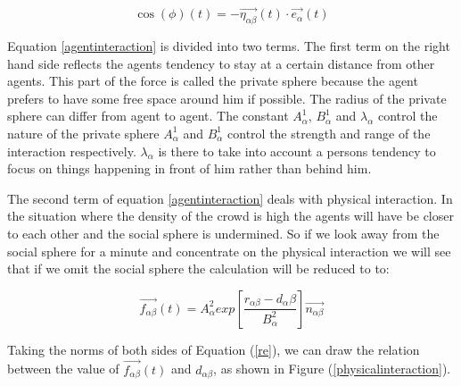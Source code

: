 \begin{equation}
\cos \left( \phi \right)
	\left( t \right) 
		= 
	- \vec{\eta_{\alpha \beta}}
		\left( t \right) 
	\cdot 
\vec{e_{\alpha}}\left( t \right)
\end{equation}

Equation \eqref{agentinteraction} is divided into two terms. The first term on 
the right hand side reflects the agents tendency to stay at a certain distance 
from other agents. This part of the force is called the private sphere because 
the agent prefers to have some free space around him if possible. The radius 
of the private sphere can differ from agent to agent. The constant 
$A_{\alpha}^{1}$, $B_{\alpha}^{1}$ and $\lambda_{\alpha}$ control the nature 
of the private sphere $A_{\alpha}^1$ and $B_{\alpha}^1$ control the strength 
and range of the interaction respectively. $\lambda_{\alpha}$ is there to take 
into account a persons tendency to focus on things happening in front of him 
rather than behind him.	%

The second term of equation \eqref{agentinteraction} deals with physical interaction.
In the situation where the density of the crowd is high the agents will have be closer
to each other and the social sphere is undermined. %
So if we look away from the social sphere for a minute and concentrate on the physical
interaction we will see that if we omit the social sphere the calculation will be reduced to
to:

\begin{equation}\label{re}
\overrightarrow{f_{\alpha\beta}}(t) = A_{\alpha}^{2} exp\left[ \frac{r_{\alpha\beta} - d_{\alpha}\beta}{B_{\alpha}^{2}}\right]  \overrightarrow{n_{\alpha\beta}}
\end{equation}

Taking the norms of both sides of Equation (\ref{re}), we can draw the relation between the value of $\overrightarrow{f_{\alpha\beta}}(t)$ and $ d_{\alpha\beta} $, as shown in Figure 
(\ref{physicalinteraction}).\\

